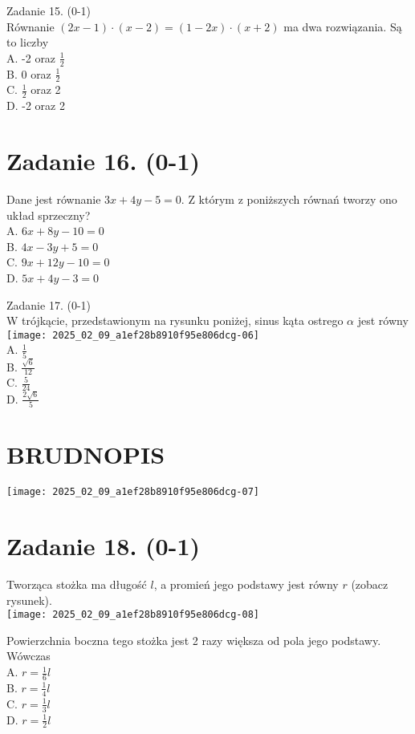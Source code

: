 \documentclass[10pt]{article}
\begin{document}
Zadanie 15. (0-1)\\
Równanie \((2 x-1) \cdot(x-2)=(1-2 x) \cdot(x+2)\) ma dwa rozwiązania. Są to liczby\\
A. -2 oraz \(\frac{1}{2}\)\\
B. 0 oraz \(\frac{1}{2}\)\\
C. \(\frac{1}{2}\) oraz 2\\
D. -2 oraz 2

\section*{Zadanie 16. (0-1)}
Dane jest równanie \(3 x+4 y-5=0\). Z którym z poniższych równań tworzy ono układ sprzeczny?\\
A. \(6 x+8 y-10=0\)\\
B. \(4 x-3 y+5=0\)\\
C. \(9 x+12 y-10=0\)\\
D. \(5 x+4 y-3=0\)

Zadanie 17. (0-1)\\
W trójkącie, przedstawionym na rysunku poniżej, sinus kąta ostrego \(\alpha\) jest równy\\
\texttt{[image: 2025\_02\_09\_a1ef28b8910f95e806dcg-06]}\\
A. \(\frac{1}{5}\)\\
B. \(\frac{\sqrt{6}}{12}\)\\
C. \(\frac{5}{24}\)\\
D. \(\frac{2 \sqrt{6}}{5}\)

\section*{BRUDNOPIS}
\begin{center}
\texttt{[image: 2025\_02\_09\_a1ef28b8910f95e806dcg-07]}
\end{center}

\section*{Zadanie 18. (0-1)}
Tworząca stożka ma długość \(l\), a promień jego podstawy jest równy \(r\) (zobacz rysunek).\\
\texttt{[image: 2025\_02\_09\_a1ef28b8910f95e806dcg-08]}

Powierzchnia boczna tego stożka jest 2 razy większa od pola jego podstawy. Wówczas\\
A. \(r=\frac{1}{6} l\)\\
B. \(r=\frac{1}{4} l\)\\
C. \(r=\frac{1}{3} l\)\\
D. \(r=\frac{1}{2} l\)
\end{document}
